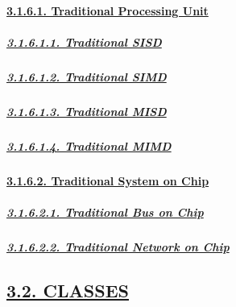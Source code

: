 \documentclass[
]{article}
\begin{document}
\hypertarget{traditional-processing-unit}{%
\paragraph{\texorpdfstring{\protect\hyperlink{traditional-processing-unit-1}{3.1.6.1.
Traditional Processing
Unit}}{3.1.6.1. Traditional Processing Unit}}\label{traditional-processing-unit}}

\hypertarget{traditional-sisd}{%
\subparagraph{\texorpdfstring{\protect\hyperlink{traditional-sisd-1}{3.1.6.1.1.
Traditional
SISD}}{3.1.6.1.1. Traditional SISD}}\label{traditional-sisd}}

\hypertarget{traditional-simd}{%
\subparagraph{\texorpdfstring{\protect\hyperlink{traditional-simd-1}{3.1.6.1.2.
Traditional
SIMD}}{3.1.6.1.2. Traditional SIMD}}\label{traditional-simd}}

\hypertarget{traditional-misd}{%
\subparagraph{\texorpdfstring{\protect\hyperlink{traditional-misd-1}{3.1.6.1.3.
Traditional
MISD}}{3.1.6.1.3. Traditional MISD}}\label{traditional-misd}}

\hypertarget{traditional-mimd}{%
\subparagraph{\texorpdfstring{\protect\hyperlink{traditional-mimd-1}{3.1.6.1.4.
Traditional
MIMD}}{3.1.6.1.4. Traditional MIMD}}\label{traditional-mimd}}

\hypertarget{traditional-system-on-chip}{%
\paragraph{\texorpdfstring{\protect\hyperlink{traditional-system-on-chip-1}{3.1.6.2.
Traditional System on
Chip}}{3.1.6.2. Traditional System on Chip}}\label{traditional-system-on-chip}}

\hypertarget{traditional-bus-on-chip}{%
\subparagraph{\texorpdfstring{\protect\hyperlink{traditional-bus-on-chip-1}{3.1.6.2.1.
Traditional Bus on
Chip}}{3.1.6.2.1. Traditional Bus on Chip}}\label{traditional-bus-on-chip}}

\hypertarget{traditional-network-on-chip}{%
\subparagraph{\texorpdfstring{\protect\hyperlink{traditional-network-on-chip-1}{3.1.6.2.2.
Traditional Network on
Chip}}{3.1.6.2.2. Traditional Network on Chip}}\label{traditional-network-on-chip}}

\hypertarget{classes}{%
\subsection{\texorpdfstring{\protect\hyperlink{classes-1}{3.2.
CLASSES}}{3.2. CLASSES}}\label{classes}}
\end{document}
